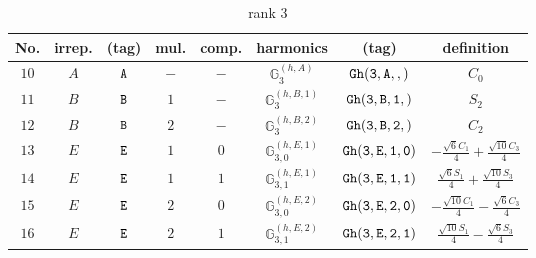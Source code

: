 \documentclass[fleqn,8pt]{jsarticle}
\begin{document}
\begin{table}[ht!]
\begin{center}
\caption{rank 3}
\renewcommand{\arraystretch}{1.3}
\begin{tabular}{cccccccc} \hline \hline
No. & irrep. & (tag) & mul. & comp. & harmonics & (tag) & definition \\ \hline
$ 10 $ & $ A $ & $ {\tt A} $ & $ - $ & $ - $ & $ \mathbb{G}_{3}^{(h,A)} $ & $ {\tt Gh(3,A,,)} $ & $ C_{0} $ \\
$ 11 $ & $ B $ & $ {\tt B} $ & $ 1 $ & $ - $ & $ \mathbb{G}_{3}^{(h,B,1)} $ & $ {\tt Gh(3,B,1,)} $ & $ S_{2} $ \\
$ 12 $ & $ B $ & $ {\tt B} $ & $ 2 $ & $ - $ & $ \mathbb{G}_{3}^{(h,B,2)} $ & $ {\tt Gh(3,B,2,)} $ & $ C_{2} $ \\
$ 13 $ & $ E $ & $ {\tt E} $ & $ 1 $ & $ 0 $ & $ \mathbb{G}_{3,0}^{(h,E,1)} $ & $ {\tt Gh(3,E,1,0)} $ & $ - \frac{\sqrt{6} C_{1}}{4} + \frac{\sqrt{10} C_{3}}{4} $ \\
$ 14 $ & $ E $ & $ {\tt E} $ & $ 1 $ & $ 1 $ & $ \mathbb{G}_{3,1}^{(h,E,1)} $ & $ {\tt Gh(3,E,1,1)} $ & $ \frac{\sqrt{6} S_{1}}{4} + \frac{\sqrt{10} S_{3}}{4} $ \\
$ 15 $ & $ E $ & $ {\tt E} $ & $ 2 $ & $ 0 $ & $ \mathbb{G}_{3,0}^{(h,E,2)} $ & $ {\tt Gh(3,E,2,0)} $ & $ - \frac{\sqrt{10} C_{1}}{4} - \frac{\sqrt{6} C_{3}}{4} $ \\
$ 16 $ & $ E $ & $ {\tt E} $ & $ 2 $ & $ 1 $ & $ \mathbb{G}_{3,1}^{(h,E,2)} $ & $ {\tt Gh(3,E,2,1)} $ & $ \frac{\sqrt{10} S_{1}}{4} - \frac{\sqrt{6} S_{3}}{4} $ \\
 \hline \hline
\end{tabular}
\end{center}
\end{table}
\end{document}
